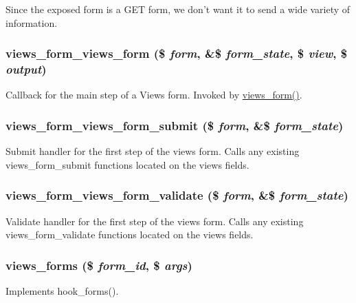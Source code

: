 Since the exposed form is a GET form, we don't want it to send a wide variety of information. \hypertarget{views_8module_a0597f9e730eb438da7c5e91eb9eec685}{
\subsubsection[{views\_\-form\_\-views\_\-form}]{\setlength{\rightskip}{0pt plus 5cm}views\_\-form\_\-views\_\-form (\$ {\em form}, \/  \&\$ {\em form\_\-state}, \/  \$ {\em view}, \/  \$ {\em output})}}
\label{views_8module_a0597f9e730eb438da7c5e91eb9eec685}
Callback for the main step of a Views form. Invoked by \hyperlink{views_8module_ad2b3623cab717e77713170df21927c92}{views\_\-form()}. \hypertarget{views_8module_a7fbf15fdfa7d026d5d8735d86d1c3fcf}{
\subsubsection[{views\_\-form\_\-views\_\-form\_\-submit}]{\setlength{\rightskip}{0pt plus 5cm}views\_\-form\_\-views\_\-form\_\-submit (\$ {\em form}, \/  \&\$ {\em form\_\-state})}}
\label{views_8module_a7fbf15fdfa7d026d5d8735d86d1c3fcf}
Submit handler for the first step of the views form. Calls any existing views\_\-form\_\-submit functions located on the views fields. \hypertarget{views_8module_a1d7ebdb64055b2c813237617e8be7241}{
\subsubsection[{views\_\-form\_\-views\_\-form\_\-validate}]{\setlength{\rightskip}{0pt plus 5cm}views\_\-form\_\-views\_\-form\_\-validate (\$ {\em form}, \/  \&\$ {\em form\_\-state})}}
\label{views_8module_a1d7ebdb64055b2c813237617e8be7241}
Validate handler for the first step of the views form. Calls any existing views\_\-form\_\-validate functions located on the views fields. \hypertarget{views_8module_afed058cc3f58a834a8c72c0a8129032b}{
\subsubsection[{views\_\-forms}]{\setlength{\rightskip}{0pt plus 5cm}views\_\-forms (\$ {\em form\_\-id}, \/  \$ {\em args})}}
\label{views_8module_afed058cc3f58a834a8c72c0a8129032b}
Implements hook\_\-forms().


